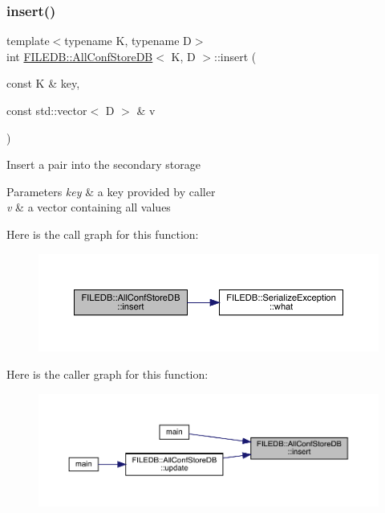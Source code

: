 \subsubsection{\texorpdfstring{insert()}{insert()}\hspace{0.1cm}{\footnotesize\ttfamily [1/2]}}
{\footnotesize\ttfamily template$<$typename K, typename D$>$ \\
int \mbox{\hyperlink{classFILEDB_1_1AllConfStoreDB}{F\+I\+L\+E\+D\+B\+::\+All\+Conf\+Store\+DB}}$<$ K, D $>$\+::insert (\begin{DoxyParamCaption}\item[{const K \&}]{key,  }\item[{const std\+::vector$<$ D $>$ \&}]{v }\end{DoxyParamCaption})\hspace{0.3cm}{\ttfamily [inline]}}

Insert a pair into the secondary storage 
\begin{DoxyParams}{Parameters}
{\em key} & a key provided by caller \\
\hline
{\em v} & a vector containing all values \\
\hline
\end{DoxyParams}
Here is the call graph for this function\+:
\nopagebreak
\begin{figure}[H]
\begin{center}
\leavevmode
\includegraphics[width=350pt]{df/db6/classFILEDB_1_1AllConfStoreDB_abf4a1ccd7306de436ba1ec61b242e02f_cgraph}
\end{center}
\end{figure}
Here is the caller graph for this function\+:\nopagebreak
\begin{figure}[H]
\begin{center}
\leavevmode
\includegraphics[width=350pt]{df/db6/classFILEDB_1_1AllConfStoreDB_abf4a1ccd7306de436ba1ec61b242e02f_icgraph}
\end{center}
\end{figure}
\mbox{\label{classFILEDB_1_1AllConfStoreDB_abf4a1ccd7306de436ba1ec61b242e02f}} 
